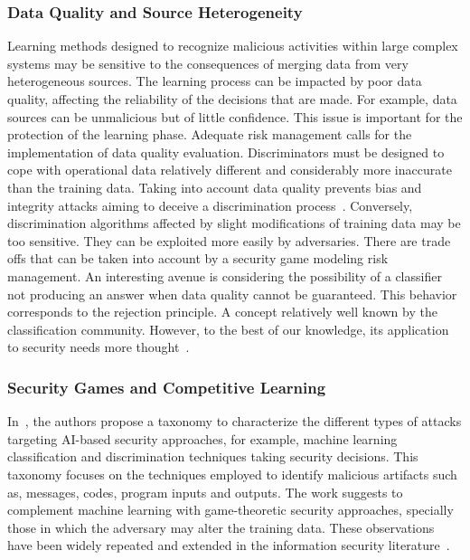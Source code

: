 \documentclass[letterpaper, 10pt, conference]{IEEEtran}
\DeclareRobustCommand{\mybox}[2][gray!20]{%
\noindent
\fcolorbox{gray!25}{gray!7}{
\parbox{.925\columnwidth}{
  #2
}}
\medskip
}
\begin{document}


\subsubsection{Data Quality and Source Heterogeneity} 

Learning methods designed to recognize malicious activities within large complex systems may be sensitive to the consequences of merging data from very 
heterogeneous sources. The learning process can be impacted by poor data quality, affecting the reliability of the  decisions that are made.
For example, data sources can be unmalicious but of 
little confidence. 
This issue is important for the protection of the learning phase. 
Adequate risk management calls for the implementation of data quality evaluation. Discriminators must be designed to cope with operational data relatively different and considerably more inaccurate than the training data. Taking into account data quality prevents bias and 
integrity attacks aiming to deceive a discrimination process~\cite{papernot2016distillation}. 
Conversely, discrimination algorithms  
affected by slight modifications of training data may be too
 sensitive. They can be exploited more easily by adversaries. 
 There are trade offs that can be taken into account by a
security game modeling risk management. An interesting avenue is
considering the possibility of a classifier not producing an answer when data quality cannot be guaranteed.
This behavior corresponds to the rejection principle.
A concept relatively well known by the classification community.
However, to the best of our
knowledge, its application to security needs more thought~\cite{de2000reject}.

\subsubsection{Security Games and Competitive Learning} 

In~\cite{barreno2010security}, the authors propose a
taxonomy to characterize the different types of attacks
targeting AI-based security approaches, for example, machine learning classification and discrimination techniques taking security decisions. This taxonomy focuses on the
techniques employed to identify malicious artifacts such as, messages, codes, program inputs and outputs. 
The work suggests to complement machine learning with game-theoretic security approaches, specially those in which the 
adversary may alter the training data. These observations have 
been widely repeated and extended in the information security literature~\cite{papernot2016towards}.
\end{document}
